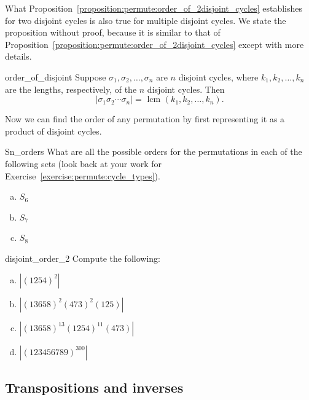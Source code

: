 What Proposition~\ref{proposition:permute:order_of_2disjoint_cycles} establishes for two disjoint cycles is also true for multiple disjoint cycles. We state the proposition without proof, because it is similar to that of Proposition~\ref{proposition:permute:order_of_2disjoint_cycles} except with more details.

\begin{prop}{order_of_disjoint}
Suppose $\sigma_1, \sigma_2, \ldots , \sigma_n$ are $n$ disjoint cycles, where $k_1, k_2, \ldots, k_n$ are the lengths, respectively, of the $n$ disjoint cycles.  Then 
\[
|\sigma_1 \sigma_2  \cdots \sigma_n| = \mbox{ lcm }(k_1, k_2, \ldots, k_n). \]
\end{prop}

\noindent
Now we can find the order of any permutation by first representing it as a product of disjoint cycles.

\begin{exercise}{Sn_orders}
What are all the possible orders for the permutations in each of the following sets (look back at your work for Exercise~\ref{exercise:permute:cycle_types}).
\begin{multicols}{3}
\begin{enumerate}[(a)]
\item
$S_6$
\item
$S_7$
\item
$S_8$
\end{enumerate}
\end{multicols}
\end{exercise}

\begin{exercise}{disjoint_order_2}
Compute the following:
\begin{multicols}{2}
\begin{enumerate}[(a)]
\item
$| (1 2 5 4)^2 |$ 
\item
$| (1 3 6 5 8)^2 (4 7 3)^2 (1 2 5) |$
\item
$| (1 3 6 5 8)^{13} (1 2 5 4)^{11} (4 7 3) |$
\item
$| (1 2  3 4 5 6 7 8 9)^{300} |$
\end{enumerate}
\end{multicols}
\end{exercise}

\subsection{Transpositions and inverses}

